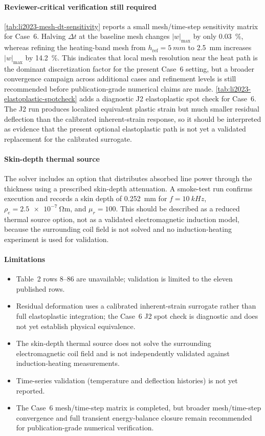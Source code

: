 \paragraph{Reviewer-critical verification still required}
\cref{tab:li2023-mesh-dt-sensitivity} reports a small mesh/time-step sensitivity matrix for Case~6. Halving $\Delta t$ at the baseline mesh changes $|w|_{\max}$ by only \SI{0.03}{\%}, whereas refining the heating-band mesh from $h_{\mathrm{ref}}=\SI{5}{mm}$ to \SI{2.5}{mm} increases $|w|_{\max}$ by \SI{14.2}{\%}. This indicates that local mesh resolution near the heat path is the dominant discretization factor for the present Case~6 setting, but a broader convergence campaign across additional cases and refinement levels is still recommended before publication-grade numerical claims are made. \cref{tab:li2023-elastoplastic-spotcheck} adds a diagnostic J2 elastoplastic spot check for Case~6. The J2 run produces localized equivalent plastic strain but much smaller residual deflection than the calibrated inherent-strain response, so it should be interpreted as evidence that the present optional elastoplastic path is not yet a validated replacement for the calibrated surrogate.

\paragraph{Skin-depth thermal source}
The solver includes an  option that distributes absorbed line power through the thickness using a prescribed skin-depth attenuation. A smoke-test run confirms execution and records a skin depth of \SI{0.252}{mm} for $f=\SI{10}{kHz}$, $\rho_e=\SI{2.5e-7}{\ohm\metre}$, and $\mu_r=100$. This should be described as a reduced thermal source option, not as a validated electromagnetic induction model, because the surrounding coil field is not solved and no induction-heating experiment is used for validation.

\paragraph{Limitations}
\begin{itemize}
  \item Table~2 rows 8--86 are unavailable; validation is limited to the eleven published rows.
  \item Residual deformation uses a calibrated inherent-strain surrogate rather than full elastoplastic integration; the Case~6 J2 spot check is diagnostic and does not yet establish physical equivalence.
  \item The skin-depth thermal source does not solve the surrounding electromagnetic coil field and is not independently validated against induction-heating measurements.
  \item Time-series validation (temperature and deflection histories) is not yet reported.
  \item The Case~6 mesh/time-step matrix is completed, but broader mesh/time-step convergence and full transient energy-balance closure remain recommended for publication-grade numerical verification.
\end{itemize}

